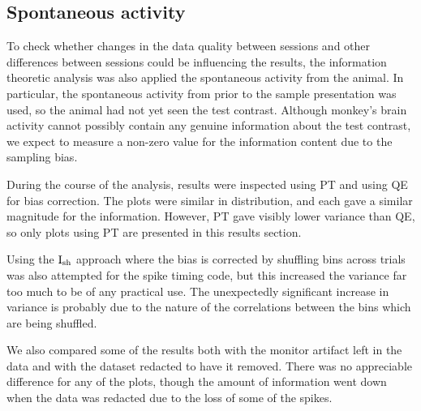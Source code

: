 \subsection{Spontaneous activity}

To check whether changes in the data quality between sessions and other differences between sessions could be influencing the results, the information theoretic analysis was also applied the spontaneous activity from the animal.
In particular, the spontaneous activity from prior to the sample presentation was used, so the animal had not yet seen the test contrast.
Although monkey's brain activity cannot possibly contain any genuine information about the test contrast, we expect to measure a non-zero value for the information content due to the sampling bias.

During the course of the analysis, results were inspected using \ac{PT} and using \ac{QE} for bias correction.
The plots were similar in distribution, and each gave a similar magnitude for the information.
However, \ac{PT} gave visibly lower variance than \ac{QE}, so only plots using \ac{PT} are presented in this results section.

Using the $\operatorname{I}_{\text{sh}}$ approach where the bias is corrected by shuffling bins across trials \citep{Montemurro2007} was also attempted for the spike timing code, but this increased the variance far too much to be of any practical use.
The unexpectedly significant increase in variance is probably due to the nature of the correlations between the bins which are being shuffled.

We also compared some of the results both with the monitor artifact left in the data and with the dataset redacted to have it removed.
There was no appreciable difference for any of the plots, though the amount of information went down when the data was redacted due to the loss of some of the spikes.

